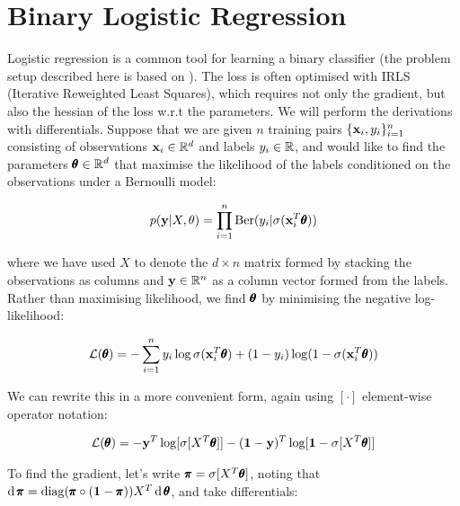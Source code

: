 \section{Binary Logistic Regression}

Logistic regression is a common tool for learning a binary classifier (the problem setup described here is based on \cite{defreitas}).  The loss is often optimised with IRLS (Iterative Reweighted Least Squares), which requires not only the gradient, but also the hessian of the loss w.r.t the parameters.  We will perform the derivations with differentials.  Suppose that we are given $n$ training pairs $\{\mathbf{x}_i, y_i\}_{i=1}^n$ consisting of observations $\mathbf{x}_i \in \mathbb{R}^d$ and labels $y_i \in \mathbb{R}$, and would like to find the parameters $\pmb{\theta} \in \mathbb{R}^d$ that maximise the likelihood of the labels conditioned on the observations under a Bernoulli model:

\begin{align*}
  p( \mathbf{y} | X, \mathbf{\theta}) = \prod_{i=1}^n \text{Ber}(y_i| \sigma(\mathbf{x}_i^T \pmb{\theta}))
\end{align*}

where we have used $X$ to denote the $d \times n$ matrix formed by stacking the observations as columns and $\mathbf{y} \in \mathbb{R}^{n} $ as a column vector formed from the labels.  Rather than maximising likelihood, we find $\pmb{\theta}$ by minimising the negative log-likelihood:

\begin{align*}
  \mathcal{L}(\pmb{\theta}) = - \sum_{i =1}^n y_i \log \sigma(\mathbf{x}_i^T\pmb{\theta}) + (1 - y_i) \log (1 - \sigma(\mathbf{x}_i^T \pmb{\theta}))
\end{align*}

We can rewrite this in a more convenient form, again using $[\cdot]$ element-wise operator notation:

\begin{align*}
  \mathcal{L}(\pmb{\theta}) = -\mathbf{y}^T \log[\sigma[X^T\pmb{\theta}]] - (\mathbf{1} - \mathbf{y})^T \log[\mathbf{1} - \sigma[X^T\pmb{\theta}]]
\end{align*}

To find the gradient, let's write $\pmb{\pi} = \sigma[X^T\pmb{\theta}]$, noting that $\operatorname{\text{d}} \pmb{\pi} = \operatorname{diag}(\pmb{\pi}\circ (\mathbf{1} - \pmb{\pi}))X^T \operatorname{\text{d}} \pmb{\theta}$, and take differentials:


